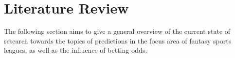 \chapter{Literature Review}

The following section aims to give a general overview of the current state of research towards the topics of predictions
in the focus area of fantasy sports leagues, as well as the influence of betting odds. 